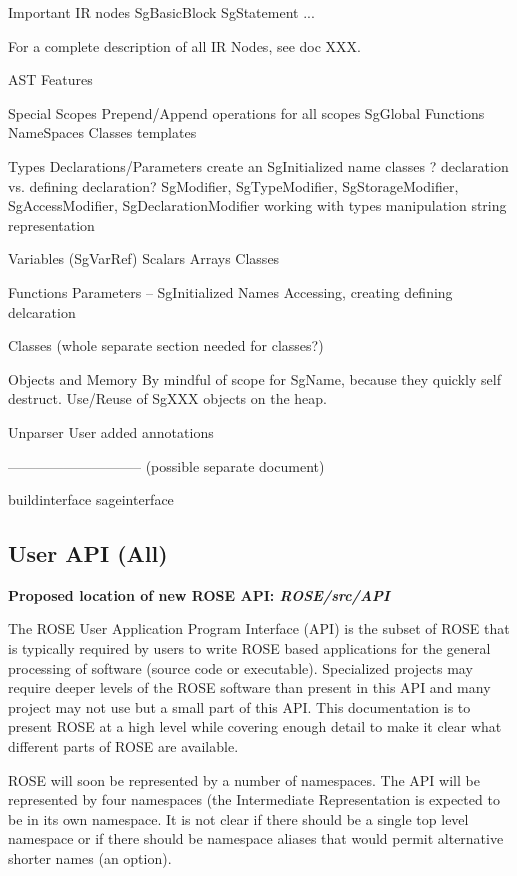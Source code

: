 {      Important IR nodes
         SgBasicBlock
         SgStatement
         ...

      For a complete description of all IR Nodes, see doc XXX.

   AST Features

      Special Scopes
         Prepend/Append operations for all scopes
         SgGlobal
         Functions
         NameSpaces
         Classes
         templates

      Types
        Declarations/Parameters create an SgInitialized name
        classes ?
        declaration vs. defining declaration?
        SgModifier, SgTypeModifier,
           SgStorageModifier, SgAccessModifier, SgDeclarationModifier
        working with types
           manipulation
           string representation

      Variables (SgVarRef)
         Scalars
         Arrays
         Classes

      Functions
           Parameters -- SgInitialized Names
              Accessing, creating
           defining delcaration

      Classes (whole separate section needed for classes?)


   Objects and Memory
      By mindful of scope for SgName, because they quickly self destruct.
      Use/Reuse of SgXXX objects on the heap.

   Unparser
      User added annotations

-----------------------------
(possible separate document)

buildinterface
sageinterface

}


\subsection{User API (All)}
{\bf Proposed location of new ROSE API: {\em ROSE/src/API}}

   The ROSE User Application Program Interface (API) is the subset of ROSE that is
typically required by users to write ROSE based applications for the general
processing of software (source code or executable).  Specialized projects may
require deeper levels of the ROSE software than present in this API and many
project may not use but a small part of this API.  This documentation is
to present ROSE at a high level while covering enough detail to make it
clear what different parts of ROSE are available.

   ROSE will soon be represented by a number of namespaces.  The
API will be represented by four namespaces (the Intermediate Representation
is expected to be in its own namespace.  It is not clear if there should
be a single top level namespace or if there should be namespace
aliases that would permit alternative shorter names (an option).



